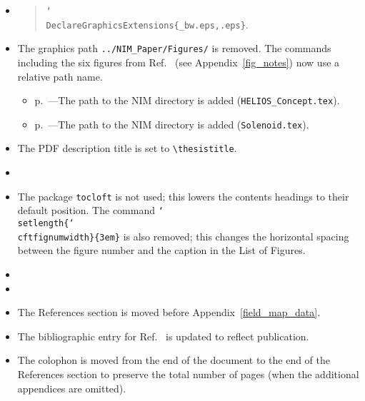 \begin{spacing}{1.55}
\begin{itemize}
\begin{itemize}
		\end{itemize}
	\item {}
	  \begin{quote}
      \texttt{\char`\\DeclareGraphicsExtensions\{\_bw.eps,.eps\}}.
    \end{quote}
  \item The graphics path \texttt{../NIM\_Paper/Figures/} is removed.  The commands including the six figures from Ref.~\cite{Lighthall_2010} (see Appendix~\ref{fig_notes}) now use a relative path name.
		\vspace{-4pt}	
		\begin{itemize}
			\item p.~\pageref{solenoid}---The path to the NIM directory is added (\verb|HELIOS_Concept.tex|).
			\item p.~\pageref{schematic}---The path to the NIM directory is added (\verb|Solenoid.tex|).
		\end{itemize}
	\item The PDF description title is set to \verb|\thesistitle|.
	\item {}	
	\item The package \texttt{tocloft} is not used; this lowers the contents headings to their default position.  The command \texttt{\char`\\setlength\{\char`\\cftfignumwidth\}\{3em\}} is also removed; this changes the horizontal spacing between the figure number and the caption in the List of Figures.
	\item {}
	\item {}
	\item The References section is moved before Appendix~\ref{field_map_data}.
	\item The bibliographic entry for Ref.~\cite{Kay_2011} is updated to reflect publication.
	\item The colophon is moved from the end of the document  to the end of the References section  to preserve the total number of pages (when the additional appendices are omitted).

\end{itemize}
\end{spacing}
